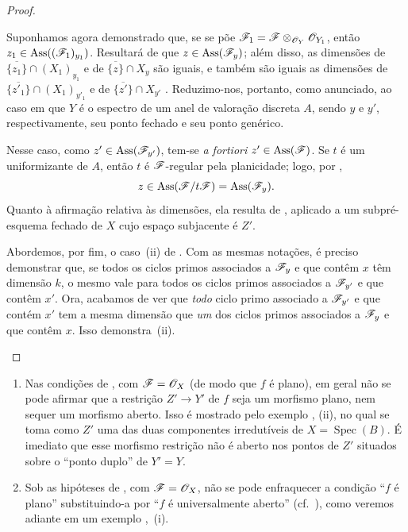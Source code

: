 \begin{proof}
\begin{env}[12.1.1.4]
Suponhamos agora demonstrado que, se se põe
$\mathscr{F}_1=\mathscr{F}\otimes_{\mathscr{O}_Y}\mathscr{O}_{Y_1}$,
então $z_1\in\operatorname{Ass}((\mathscr{F}_1)_{y_1})$.
Resultará de  que
$z\in\operatorname{Ass}(\mathscr{F}_y)$; além disso,
as dimensões de
$\overline{\{z_1\}}\cap(X_1)_{y_1}$ e de
$\overline{\{z\}}\cap X_y$ são iguais, e também
são iguais as dimensões de
$\overline{\{z'_1\}}\cap(X_1)_{y'_1}$ e de
$\overline{\{z'\}}\cap X_{y'}$
. Reduzimo-nos, portanto, como
anunciado, ao caso em que $Y$ é o espectro de um
anel de valoração discreta $A$, sendo $y$ e $y'$,
respectivamente, seu ponto fechado e seu ponto
genérico.

Nesse caso, como $z'\in\operatorname{Ass}(\mathscr{F}_{y'})$,
tem-se \emph{a fortiori}
$z'\in\operatorname{Ass}(\mathscr{F})$. Se $t$ é um
uniformizante de $A$, então $t$ é $\mathscr{F}$-regular
pela planicidade; logo, por ,
\[
z\in\operatorname{Ass}(\mathscr{F}/t\mathscr{F})
=\operatorname{Ass}(\mathscr{F}_y).
\]
Quanto à afirmação relativa às dimensões, ela resulta
de , aplicado a um subpré-esquema
fechado de $X$ cujo espaço subjacente é $Z'$.

Abordemos, por fim, o caso~(ii) de .
Com as mesmas notações, é preciso demonstrar que, se
todos os ciclos primos associados a $\mathscr{F}_y$ e que
contêm $x$ têm dimensão $k$, o mesmo vale para todos
os ciclos primos associados a $\mathscr{F}_{y'}$ e que
contêm $x'$. Ora, acabamos de ver que \emph{todo}
ciclo primo associado a $\mathscr{F}_{y'}$ e que contém
$x'$ tem a mesma dimensão que \emph{um} dos ciclos
primos associados a $\mathscr{F}_y$ e que contêm $x$.
Isso demonstra~(ii).
\end{env}
\end{proof}

\begin{remarks}[12.1.2]
\label{IV.12.1.2}
\begin{enumerate}[label=(\roman*)]
\item Nas condições de , com
$\mathscr{F}=\mathscr{O}_X$ (de modo que $f$ é plano), em geral
não se pode afirmar que a restrição $Z'\to Y'$ de $f$
seja um morfismo plano, nem sequer um morfismo aberto.
Isso é mostrado pelo exemplo ,
(ii), no qual se toma como $Z'$ uma das duas componentes
irredutíveis de $X=\operatorname{Spec}(B)$. É imediato
que esse morfismo restrição não é aberto nos pontos
de $Z'$ situados sobre o
\textquotedblleft{}ponto duplo\textquotedblright{}
de $Y'=Y$.
\item Sob as hipóteses de , com
$\mathscr{F}=\mathscr{O}_X$, não se pode enfraquecer a condição
\textquotedblleft{}$f$ é plano\textquotedblright{}
substituindo-a por
\textquotedblleft{}$f$ é universalmente aberto\textquotedblright{}
(cf.\ ), como veremos adiante
em um exemplo ,~(i).
\end{enumerate}
\end{remarks}

